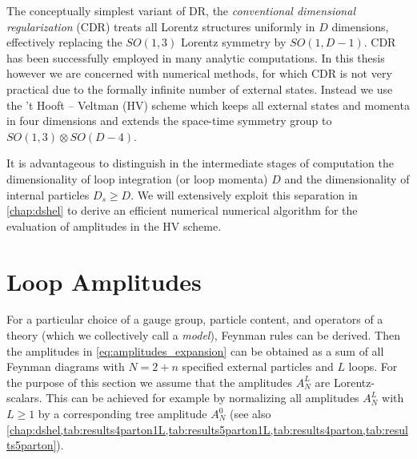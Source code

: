 The conceptually simplest variant of DR, the \emph{conventional dimensional regularization} (CDR)
treats all Lorentz structures uniformly in $D$ dimensions, effectively replacing the $SO(1,3)$ Lorentz symmetry by $SO(1,D-1)$.
CDR has been successfully employed in many analytic computations.
In this thesis however we are concerned with numerical methods, for which CDR is not very practical due to the
formally infinite number of external states.
Instead we use the 't Hooft -- Veltman (HV) scheme which keeps all external states and momenta in four dimensions and
extends the space-time symmetry group to $SO(1,3)\otimes SO(D-4)$.

It is advantageous to distinguish in the intermediate stages of computation the dimensionality of loop integration (or loop momenta) $D$ and
the dimensionality of internal particles $D_s \geq  D$.
We will extensively exploit this separation in \cref{chap:dshel} to derive an efficient numerical numerical algorithm
for the evaluation of amplitudes in the HV scheme.


\section{Loop Amplitudes}

For a particular choice of a gauge group, particle content, and operators of
a theory (which we collectively call a \emph{model}), Feynman rules can be derived.
Then the amplitudes in \cref{eq:amplitudes_expansion} can be obtained as a sum of all Feynman diagrams
with $N = 2+n$ specified external particles and $L$ loops.
For the purpose of this section we assume that the amplitudes $A^{L}_N$ are Lorentz-scalars.
This can be achieved for example by normalizing all amplitudes $A^{L}_N$ with $L\geq1$ by
a corresponding tree amplitude $A^{0}_N$ 
(see also \cref{chap:dshel,tab:results4parton1L,tab:results5parton1L,tab:results4parton,tab:results5parton}).


